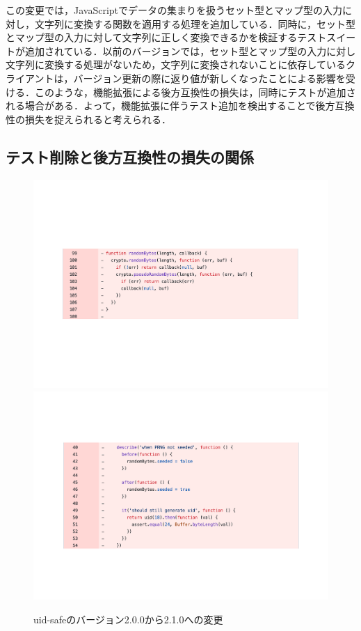 \documentclass[11pt,dvipdfmx]{jreport}
\begin{document}
この変更では，JavaScriptでデータの集まりを扱うセット型とマップ型の入力に対し，文字列に変換する関数を適用する処理を追加している．同時に，セット型とマップ型の入力に対して文字列に正しく変換できるかを検証するテストスイートが追加されている．以前のバージョンでは，セット型とマップ型の入力に対し文字列に変換する処理がないため，文字列に変換されないことに依存しているクライアントは，バージョン更新の際に返り値が新しくなったことによる影響を受ける．このような，機能拡張による後方互換性の損失は，同時にテストが追加される場合がある．よって，機能拡張に伴うテスト追加を検出することで後方互換性の損失を捉えられると考えられる．

\subsection{テスト削除と後方互換性の損失の関係}

\begin{figure}[t]
  \label{fig:rq1.delete-test}
  \centering
  \includegraphics[width=1.0\linewidth]{fig/rq1/uuid/randomByte.pdf}
  \includegraphics[width=1.0\linewidth]{fig/rq1/uuid/randomByte.test.pdf}
  \caption{uid-safeのバージョン2.0.0から2.1.0への変更}
\end{figure}
\end{document}
